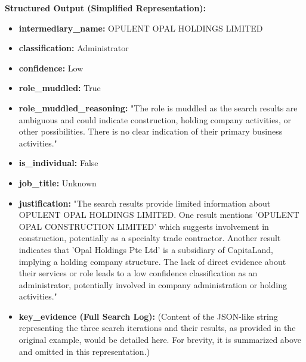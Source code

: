 \textbf{Structured Output (Simplified Representation):}
\begin{itemize}
    \item \textbf{intermediary\_name:} OPULENT OPAL HOLDINGS LIMITED
    \item \textbf{classification:} Administrator
    \item \textbf{confidence:} Low
    \item \textbf{role\_muddled:} True
    \item \textbf{role\_muddled\_reasoning:} "The role is muddled as the search results are ambiguous and could indicate construction, holding company activities, or other possibilities. There is no clear indication of their primary business activities."
    \item \textbf{is\_individual:} False
    \item \textbf{job\_title:} Unknown
    \item \textbf{justification:} "The search results provide limited information about OPULENT OPAL HOLDINGS LIMITED. One result mentions 'OPULENT OPAL CONSTRUCTION LIMITED' which suggests involvement in construction, potentially as a specialty trade contractor. Another result indicates that 'Opal Holdings Pte Ltd' is a subsidiary of CapitaLand, implying a holding company structure. The lack of direct evidence about their services or role leads to a low confidence classification as an administrator, potentially involved in company administration or holding activities."
    \item \textbf{key\_evidence (Full Search Log):} (Content of the JSON-like string representing the three search iterations and their results, as provided in the original example, would be detailed here. For brevity, it is summarized above and omitted in this representation.)
\end{itemize}

